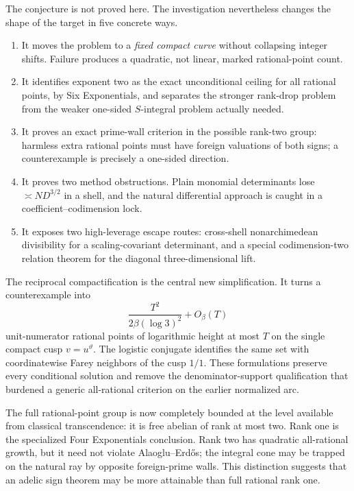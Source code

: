 \documentclass[10pt,oneside]{article}
\theoremstyle{definition}
\theoremstyle{remark}
\newcommand{\thetaq}{\vartheta}
\begin{document}
\begin{summarybox}
The conjecture is not proved here.  The investigation nevertheless changes the shape of the target in five concrete ways.
\begin{enumerate}
\item It moves the problem to a \emph{fixed compact curve} without collapsing integer shifts.  Failure produces a quadratic, not linear, marked rational-point count.
\item It identifies exponent two as the exact unconditional ceiling for all rational points, by Six Exponentials, and separates the stronger rank-drop problem from the weaker one-sided \(S\)-integral problem actually needed.
\item It proves an exact prime-wall criterion in the possible rank-two group: harmless extra rational points must have foreign valuations of both signs; a counterexample is precisely a one-sided direction.
\item It proves two method obstructions.  Plain monomial determinants lose \(\asymp ND^{3/2}\) in a shell, and the natural differential approach is caught in a coefficient--codimension lock.
\item It exposes two high-leverage escape routes: cross-shell nonarchimedean divisibility for a scaling-covariant determinant, and a special codimension-two relation theorem for the diagonal three-dimensional lift.
\end{enumerate}
\end{summarybox}

The reciprocal compactification is the central new simplification.  It turns a counterexample into
\[
 \frac{T^2}{2\beta(\log3)^2}+O_\beta(T)
\]
unit-numerator rational points of logarithmic height at most \(T\) on the single compact cusp \(v=u^{\thetaq}\).  The logistic conjugate identifies the same set with coordinatewise Farey neighbors of the cusp \(1/1\).  These formulations preserve every conditional solution and remove the denominator-support qualification that burdened a generic all-rational criterion on the earlier normalized arc.

The full rational-point group is now completely bounded at the level available from classical transcendence: it is free abelian of rank at most two.  Rank one is the specialized Four Exponentials conclusion.  Rank two has quadratic all-rational growth, but it need not violate Alaoglu--Erd\H{o}s; the integral cone may be trapped on the natural ray by opposite foreign-prime walls.  This distinction suggests that an adelic sign theorem may be more attainable than full rational rank one.
\end{document}
